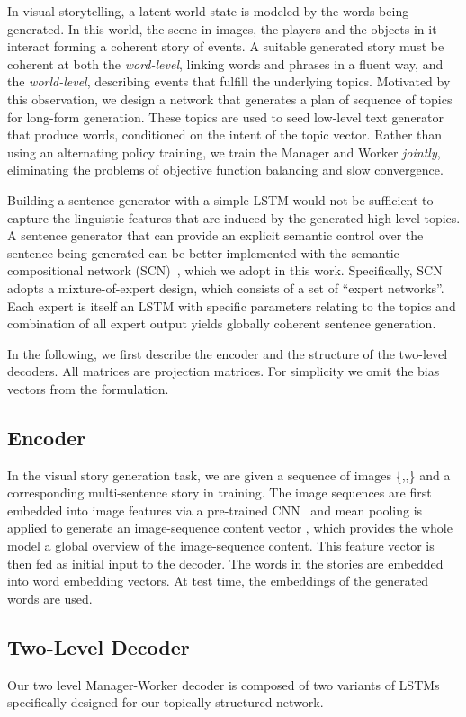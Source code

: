 \documentclass[letterpaper]{article} \usepackage{aaai19}  \usepackage{times}  \usepackage{helvet}  \usepackage{courier}  \usepackage{url}  \usepackage{graphicx}
\begin{document}
In visual storytelling, a latent world state is modeled by the words being generated. 
In this world, the scene in images, the players and the objects in it interact forming a coherent story of events.
A suitable generated story must be coherent at both the \textit{word-level}, linking words and phrases in a fluent way, and the \textit{world-level}, describing events that fulfill the underlying topics. Motivated by this observation, we design a network that generates a plan of sequence of topics for long-form generation. These topics are used to seed low-level text generator that produce words, conditioned on the intent of the topic vector. Rather than using an alternating policy training, we train the Manager and Worker \emph{jointly}, eliminating the problems of objective function balancing and slow convergence.

Building a sentence generator with a simple LSTM would not be sufficient to capture the linguistic features that are induced by the generated high level topics.  
A sentence generator that can provide an explicit semantic control over the sentence being generated can be better implemented with the semantic compositional network (SCN)~\cite{SCN_CVPR2017}, which we adopt in this work. 
Specifically, SCN adopts a mixture-of-expert design, which consists of a set of ``expert networks''. Each expert is itself an LSTM with specific parameters relating to the topics and combination of all expert output yields globally coherent sentence generation.

In the following, we first describe the encoder and the structure of the two-level decoders.
All  matrices are projection matrices. For simplicity we omit the bias vectors from the formulation.

\subsection{Encoder}
In the visual story generation task, we are given a sequence of images \{,,\} and a corresponding multi-sentence story in training. The image sequences are first embedded into image features  via a pre-trained CNN~\cite{he2016deep} and mean pooling is applied to generate an image-sequence content vector , which provides the whole model a global overview of the image-sequence content. This feature vector is then fed as initial input to the decoder. The words in the stories are embedded into word embedding vectors. At test time, the embeddings of the generated words are used.

\subsection{Two-Level Decoder}
Our two level Manager-Worker decoder is composed of two variants of LSTMs specifically designed for our topically structured network. 
\end{document}

